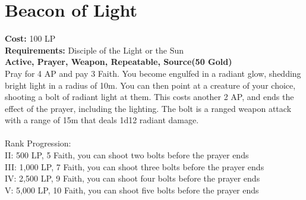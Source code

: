 \section{Beacon of Light}\label{prayer:beaconOfLight}
\textbf{Cost:} 100 LP\\
\textbf{Requirements:} Disciple of the Light or the Sun \\
\textbf{Active, Prayer, Weapon, Repeatable, Source(50 Gold)}\\
Pray for 4 AP and pay 3 Faith.
You become engulfed in a radiant glow, shedding bright light in a radius of 10m.
You can then point at a creature of your choice, shooting a bolt of radiant light at them.
This costs another 2 AP, and ends the effect of the prayer, including the lighting.
The bolt is a ranged weapon attack with a range of 15m that deals 1d12 radiant damage.\\
\\
Rank Progression:\\
II: 500 LP, 5 Faith, you can shoot two bolts before the prayer ends\\
III: 1,000 LP, 7 Faith, you can shoot three bolts before the prayer ends\\
IV: 2,500 LP, 9 Faith, you can shoot four bolts before the prayer ends\\
V: 5,000 LP, 10 Faith, you can shoot five bolts before the prayer ends\\